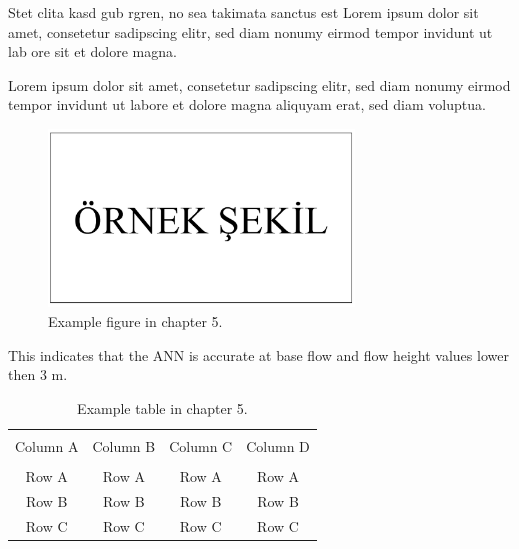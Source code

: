 Stet clita kasd gub rgren, no sea takimata sanctus est Lorem ipsum dolor sit amet, consetetur sadipscing elitr, sed diam nonumy eirmod tempor invidunt ut lab ore sit et dolore magna.


Lorem ipsum dolor sit amet, consetetur sadipscing elitr, sed diam nonumy eirmod tempor invidunt ut labore et dolore magna aliquyam erat, sed diam voluptua.

\begin{figure}[h]
	\centering
	\includegraphics[width=230pt,keepaspectratio=true]{./fig/sekil5}
	\vspace{3mm}
	\caption{Example figure in chapter 5.}
	\label{Figure5.1}
\end{figure}

This indicates that the ANN is accurate at base flow and flow height values lower then 3 m. 

\begin{table}[h]
	{\setlength{\tabcolsep}{14pt}
		\caption{Example table in chapter 5.}
		\begin{center}
			\vspace{-6mm}
			\begin{tabular}{cccc}
			    \hline \\[-2.45ex] \hline \\[-2.1ex]
				Column A & Column B & Column C & Column D \\
				\hline \\[-1.8ex]
				Row A & Row A & Row A & Row A \\
				Row B & Row B & Row B & Row B \\
				Row C & Row C & Row C & Row C \\
				[-0ex] \hline
			\end{tabular}
			\vspace{-6mm}
		\end{center}
		\label{Table5.1}}
\end{table}

